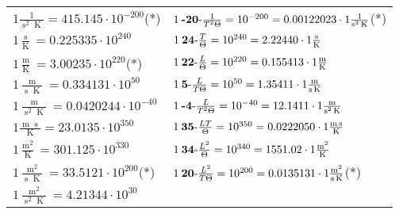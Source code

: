 \begin{center}
\begin{longtable}{l l}
{\color{black}$1 \bm{\mathrm{ }}\frac1{\operatorname{s}^2\operatorname{K}} = 415.145\cdot10^{-200} $}\quad(*)&
	{\color{black}$1\:\text{\textbf{-20}-} \frac1{T^2\Theta}=10^{-200} = 0.00122023 \cdot 1 \bm{\mathrm{ }}\frac1{\operatorname{s}^2\operatorname{K}}$}\quad(*)\\
{\color{black}$1 \bm{\mathrm{ }}\frac{\operatorname{s}}{\operatorname{K}} = 0.225335\cdot10^{240} $}&
	{\color{black}$1\:\text{\textbf{24}-} \frac{T}{\Theta}=10^{240} = 2.22440 \cdot 1 \bm{\mathrm{ }}\frac{\operatorname{s}}{\operatorname{K}}$}\\
{\color{black}$1 \bm{\mathrm{ }}\frac{\operatorname{m}}{\operatorname{K}} = 3.00235\cdot10^{220} $}\quad(*)&
	{\color{black}$1\:\text{\textbf{22}-} \frac{L}{\Theta}=10^{220} = 0.155413 \cdot 1 \bm{\mathrm{ }}\frac{\operatorname{m}}{\operatorname{K}}$}\\
{\color{black}$1 \bm{\mathrm{ }}\frac{\operatorname{m}}{\operatorname{s}\operatorname{K}} = 0.334131\cdot10^{50} $}&
	{\color{black}$1\:\text{\textbf{5}-} \frac{L}{T\Theta}=10^{50} = 1.35411 \cdot 1 \bm{\mathrm{ }}\frac{\operatorname{m}}{\operatorname{s}\operatorname{K}}$}\\
{\color{black}$1 \bm{\mathrm{ }}\frac{\operatorname{m}}{\operatorname{s}^2\operatorname{K}} = 0.0420244\cdot10^{-40} $}&
	{\color{black}$1\:\text{\textbf{-4}-} \frac{L}{T^2\Theta}=10^{-40} = 12.1411 \cdot 1 \bm{\mathrm{ }}\frac{\operatorname{m}}{\operatorname{s}^2\operatorname{K}}$}\\
{\color{black}$1 \bm{\mathrm{ }}\frac{\operatorname{m}\operatorname{s}}{\operatorname{K}} = 23.0135\cdot10^{350} $}&
	{\color{black}$1\:\text{\textbf{35}-} \frac{LT}{\Theta}=10^{350} = 0.0222050 \cdot 1 \bm{\mathrm{ }}\frac{\operatorname{m}\operatorname{s}}{\operatorname{K}}$}\\
{\color{black}$1 \bm{\mathrm{ }}\frac{\operatorname{m}^2}{\operatorname{K}} = 301.125\cdot10^{330} $}&
	{\color{black}$1\:\text{\textbf{34}-} \frac{L^2}{\Theta}=10^{340} = 1551.02 \cdot 1 \bm{\mathrm{ }}\frac{\operatorname{m}^2}{\operatorname{K}}$}\\
{\color{black}$1 \bm{\mathrm{ }}\frac{\operatorname{m}^2}{\operatorname{s}\operatorname{K}} = 33.5121\cdot10^{200} $}\quad(*)&
	{\color{black}$1\:\text{\textbf{20}-} \frac{L^2}{T\Theta}=10^{200} = 0.0135131 \cdot 1 \bm{\mathrm{ }}\frac{\operatorname{m}^2}{\operatorname{s}\operatorname{K}}$}\quad(*)\\
{\color{black}$1 \bm{\mathrm{ }}\frac{\operatorname{m}^2}{\operatorname{s}^2\operatorname{K}} = 4.21344\cdot10^{30} $}&

\end{longtable}
\end{center}
